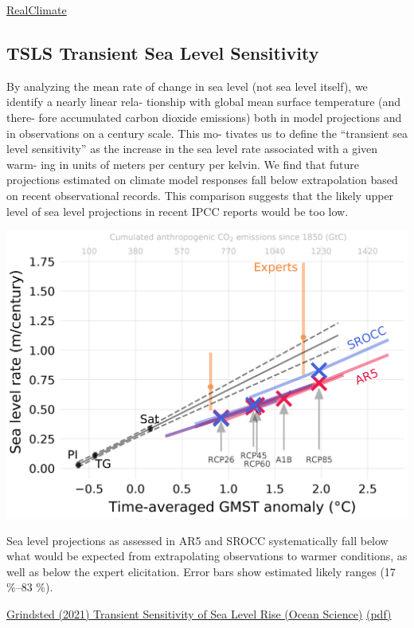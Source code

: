 \documentclass[
]{book}
\begin{document}
\href{https://www.realclimate.org/index.php/archives/2021/05/why-is-future-sea-level-rise-still-so-uncertain/\#.YKyaa3u_nmc.twitter}{RealClimate}

\hypertarget{tsls-transient-sea-level-sensitivity}{%
\subsection{TSLS Transient Sea Level Sensitivity}\label{tsls-transient-sea-level-sensitivity}}

By analyzing the mean rate of change in sea
level (not sea level itself), we identify a nearly linear rela-
tionship with global mean surface temperature (and there-
fore accumulated carbon dioxide emissions) both in model
projections and in observations on a century scale. This mo-
tivates us to define the ``transient sea level sensitivity'' as the
increase in the sea level rate associated with a given warm-
ing in units of meters per century per kelvin. We find that
future projections estimated on climate model responses fall
below extrapolation based on recent observational records.
This comparison suggests that the likely upper level of sea
level projections in recent IPCC reports would be too low.

\includegraphics{fig/Transient_Sea_Level_Sensitivity.png}

Sea level projections as assessed in AR5 and SROCC systematically fall
below what would be expected from extrapolating observations to
warmer conditions, as well as below the expert elicitation. Error
bars show estimated likely ranges (17 \%--83 \%).

\href{https://os.copernicus.org/articles/17/181/2021/}{Grindsted (2021) Transient Sensitivity of Sea Level Rise (Ocean Science)}
\href{pdf/Grindsted_2021_Transient_Sensitivity_of_Sea_Level_Rise.pdf}{(pdf)}
\end{document}
